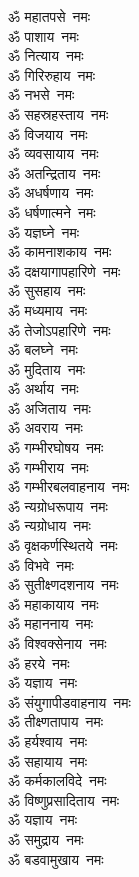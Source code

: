 \begin{multicols}{2}
\begin{flushleft}
ॐ महातपसे~नमः\\
ॐ पाशाय~नमः\\
ॐ नित्याय~नमः\\
ॐ गिरिरुहाय~नमः\\
ॐ नभसे~नमः\\
ॐ सहस्रहस्ताय~नमः\hfill{}\\
ॐ विजयाय~नमः\\
ॐ व्यवसायाय~नमः\\
ॐ अतन्द्रिताय~नमः\\
ॐ अधर्षणाय~नमः\\
ॐ धर्षणात्मने~नमः\\
ॐ यज्ञघ्ने~नमः\\
ॐ कामनाशकाय~नमः\\
ॐ दक्षयागापहारिणे~नमः\\
ॐ सुसहाय~नमः\\
ॐ मध्यमाय~नमः\hfill{}\\
ॐ तेजोऽपहारिणे~नमः\\
ॐ बलघ्ने~नमः\\
ॐ मुदिताय~नमः\\
ॐ अर्थाय~नमः\\
ॐ अजिताय~नमः\\
ॐ अवराय~नमः\\
ॐ गम्भीरघोषय~नमः\\
ॐ गम्भीराय~नमः\\
ॐ गम्भीरबलवाहनाय~नमः\\
ॐ न्यग्रोधरूपाय~नमः\hfill{}\\
ॐ न्यग्रोधाय~नमः\\
ॐ वृक्षकर्णस्थितये~नमः\\
ॐ विभवे~नमः\\
ॐ सुतीक्ष्णदशनाय~नमः\\
ॐ महाकायाय~नमः\\
ॐ महाननाय~नमः\\
ॐ विश्वक्सेनाय~नमः\\
ॐ हरये~नमः\\
ॐ यज्ञाय~नमः\\
ॐ संयुगापीडवाहनाय~नमः\hfill{}\\
ॐ तीक्ष्णतापाय~नमः\\
ॐ हर्यश्वाय~नमः\\
ॐ सहायाय~नमः\\
ॐ कर्मकालविदे~नमः\\
ॐ विष्णुप्रसादिताय~नमः\\
ॐ यज्ञाय~नमः\\
ॐ समुद्राय~नमः\\
ॐ बडवामुखाय~नमः\\

\end{flushleft}
\end{multicols}
